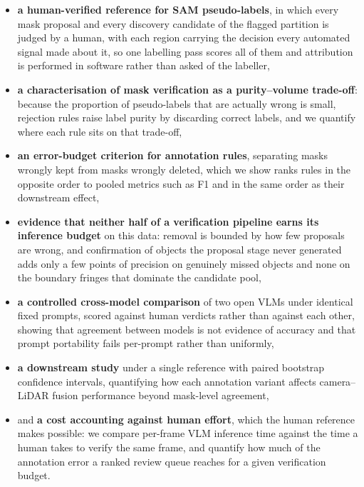 \documentclass[conference]{IEEEtran}
\begin{document}
\begin{itemize}
    \item \textbf{a human-verified reference for SAM pseudo-labels}, in which every mask proposal and every discovery candidate of the flagged partition is judged by a human, with each region carrying the decision every automated signal made about it, so one labelling pass scores all of them and attribution is performed in software rather than asked of the labeller,
    \item \textbf{a characterisation of mask verification as a purity--volume trade-off}: because the proportion of pseudo-labels that are actually wrong is small, rejection rules raise label purity by discarding correct labels, and we quantify where each rule sits on that trade-off,
    \item \textbf{an error-budget criterion for annotation rules}, separating masks wrongly kept from masks wrongly deleted, which we show ranks rules in the opposite order to pooled metrics such as F1 and in the same order as their downstream effect,
    \item \textbf{evidence that neither half of a verification pipeline earns its inference budget} on this data: removal is bounded by how few proposals are wrong, and confirmation of objects the proposal stage never generated adds only a few points of precision on genuinely missed objects and none on the boundary fringes that dominate the candidate pool,
    \item \textbf{a controlled cross-model comparison} of two open VLMs under identical fixed prompts, scored against human verdicts rather than against each other, showing that agreement between models is not evidence of accuracy and that prompt portability fails per-prompt rather than uniformly,
    \item \textbf{a downstream study} under a single reference with paired bootstrap confidence intervals, quantifying how each annotation variant affects camera–LiDAR fusion performance beyond mask-level agreement,
    \item and \textbf{a cost accounting against human effort}, which the human reference makes possible: we compare per-frame VLM inference time against the time a human takes to verify the same frame, and quantify how much of the annotation error a ranked review queue reaches for a given verification budget.
\end{itemize}
\end{document}
